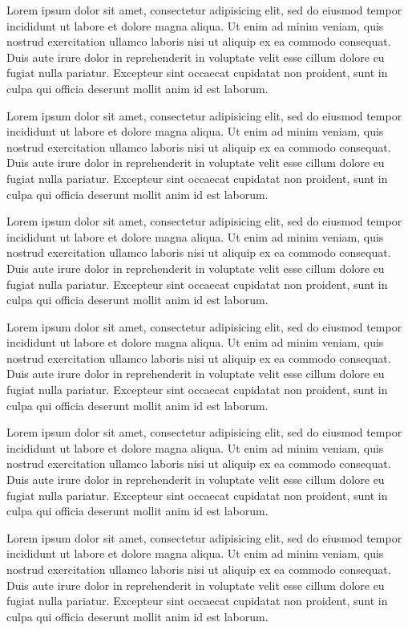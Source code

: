 \documentclass[	paper=a4,
				fontsize=10pt,
				twoside,
				headings=small]{scrartcl}
\begin{document}
\begin{multicols}{2}
\begin{linenumbers}
Lorem ipsum dolor sit amet, consectetur adipisicing elit, sed do eiusmod
tempor incididunt ut labore et dolore magna aliqua. Ut enim ad minim veniam,
quis nostrud exercitation ullamco laboris nisi ut aliquip ex ea commodo
consequat. Duis aute irure dolor in reprehenderit in voluptate velit esse
cillum dolore eu fugiat nulla pariatur. Excepteur sint occaecat cupidatat non
proident, sunt in culpa qui officia deserunt mollit anim id est laborum.

Lorem ipsum dolor sit amet, consectetur adipisicing elit, sed do eiusmod
tempor incididunt ut labore et dolore magna aliqua. Ut enim ad minim veniam,
quis nostrud exercitation ullamco laboris nisi ut aliquip ex ea commodo
consequat. Duis aute irure dolor in reprehenderit in voluptate velit esse
cillum dolore eu fugiat nulla pariatur. Excepteur sint occaecat cupidatat non
proident, sunt in culpa qui officia deserunt mollit anim id est laborum.

Lorem ipsum dolor sit amet, consectetur adipisicing elit, sed do eiusmod
tempor incididunt ut labore et dolore magna aliqua. Ut enim ad minim veniam,
quis nostrud exercitation ullamco laboris nisi ut aliquip ex ea commodo
consequat. Duis aute irure dolor in reprehenderit in voluptate velit esse
cillum dolore eu fugiat nulla pariatur. Excepteur sint occaecat cupidatat non
proident, sunt in culpa qui officia deserunt mollit anim id est laborum.

Lorem ipsum dolor sit amet, consectetur adipisicing elit, sed do eiusmod
tempor incididunt ut labore et dolore magna aliqua. Ut enim ad minim veniam,
quis nostrud exercitation ullamco laboris nisi ut aliquip ex ea commodo
consequat. Duis aute irure dolor in reprehenderit in voluptate velit esse
cillum dolore eu fugiat nulla pariatur. Excepteur sint occaecat cupidatat non
proident, sunt in culpa qui officia deserunt mollit anim id est laborum.

Lorem ipsum dolor sit amet, consectetur adipisicing elit, sed do eiusmod
tempor incididunt ut labore et dolore magna aliqua. Ut enim ad minim veniam,
quis nostrud exercitation ullamco laboris nisi ut aliquip ex ea commodo
consequat. Duis aute irure dolor in reprehenderit in voluptate velit esse
cillum dolore eu fugiat nulla pariatur. Excepteur sint occaecat cupidatat non
proident, sunt in culpa qui officia deserunt mollit anim id est laborum.

Lorem ipsum dolor sit amet, consectetur adipisicing elit, sed do eiusmod
tempor incididunt ut labore et dolore magna aliqua. Ut enim ad minim veniam,
quis nostrud exercitation ullamco laboris nisi ut aliquip ex ea commodo
consequat. Duis aute irure dolor in reprehenderit in voluptate velit esse
cillum dolore eu fugiat nulla pariatur. Excepteur sint occaecat cupidatat non
proident, sunt in culpa qui officia deserunt mollit anim id est laborum.

\end{linenumbers}
\end{multicols}

%
\end{document}
